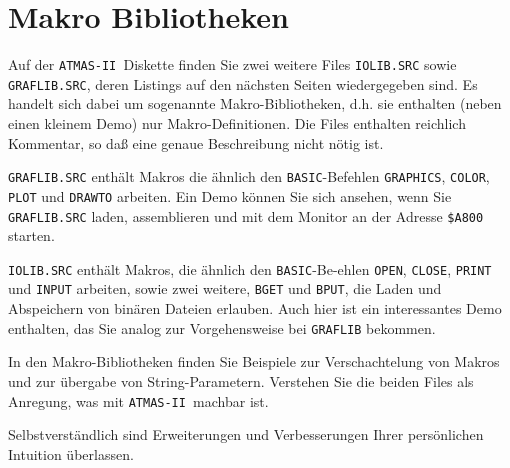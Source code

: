 \documentclass[10pt,a4paper,twoside,final,openright,titlepage]{memoir}
\def\atmas{\texttt{AT\-MAS-II }}
\begin{document}
\section{Makro Bibliotheken}

Auf der \atmas Diskette finden Sie zwei weitere
Files \texttt{IOLIB.SRC} sowie \texttt{GRAFLIB.SRC}, deren Listings auf
den nächsten Seiten wiedergegeben sind. Es handelt
sich dabei um sogenannte Makro-Bibliotheken, d.h. sie
enthalten (neben einen kleinem Demo) nur Makro-Definitionen.
Die Files enthalten reichlich Kommentar, so
daß eine genaue Beschreibung nicht nötig ist.

\texttt{GRAFLIB.SRC} enthält Makros die ähnlich den \texttt{BASIC}-Befehlen
\texttt{GRAPHICS}, \texttt{COLOR}, \texttt{PLOT} und \texttt{DRAWTO} arbeiten. Ein
Demo können Sie sich ansehen, wenn Sie \texttt{GRAFLIB.SRC}
laden, assemblieren und mit dem Monitor an der Adresse
\texttt{\$A800} starten.

\texttt{IOLIB.SRC} enthält Makros, die ähnlich den \texttt{BASIC}-Be-ehlen
\texttt{OPEN}, \texttt{CLOSE}, \texttt{PRINT} und \texttt{INPUT} arbeiten, sowie
zwei weitere, \texttt{BGET} und \texttt{BPUT}, die Laden und Abspeichern
von binären Dateien erlauben. Auch hier ist ein
interessantes Demo enthalten, das Sie analog zur
Vorgehensweise bei \texttt{GRAFLIB} bekommen.

In den Makro-Bibliotheken finden Sie Beispiele zur
Verschachtelung von Makros und zur übergabe von
String-Parametern. Verstehen Sie die beiden Files als
Anregung, was mit \atmas machbar ist.

Selbstverständlich sind Erweiterungen und Verbesserungen
Ihrer persön\-lichen Intuition überlassen.
\end{document}
